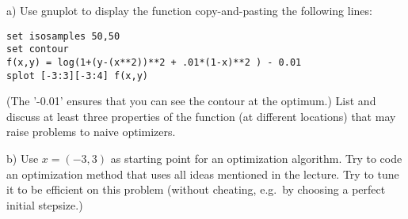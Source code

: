a) Use gnuplot to display the function copy-and-pasting the following
lines:

\begin{code}
\begin{Verbatim}[numbers=none]
set isosamples 50,50
set contour
f(x,y) = log(1+(y-(x**2))**2 + .01*(1-x)**2 ) - 0.01
splot [-3:3][-3:4] f(x,y)
\end{Verbatim}
\end{code}

(The '-0.01' ensures that you can see the contour at the optimum.)
List and discuss at least three properties of the function (at
different locations) that may raise problems to naive optimizers.

b) Use $x=(-3,3)$ as starting point for an optimization algorithm. Try
to code an optimization method that uses all ideas mentioned in the
lecture. Try to tune it to be efficient on this problem (without
cheating, e.g.\ by choosing a perfect initial stepsize.)


\exerfoot
